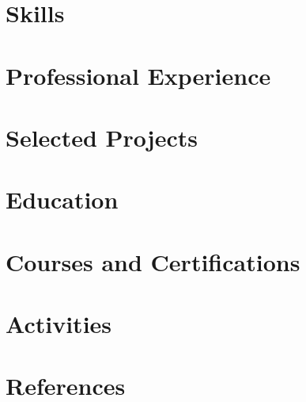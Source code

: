 \documentclass[10pt]{article}
\begin{document}
\pagestyle{others}\thispagestyle{first_page}



\section{Skills}


\section{Professional Experience}



\section{Selected Projects}




\section{Education}



\section{Courses and Certifications}


\section{Activities}

\section{References}

\end{document}
